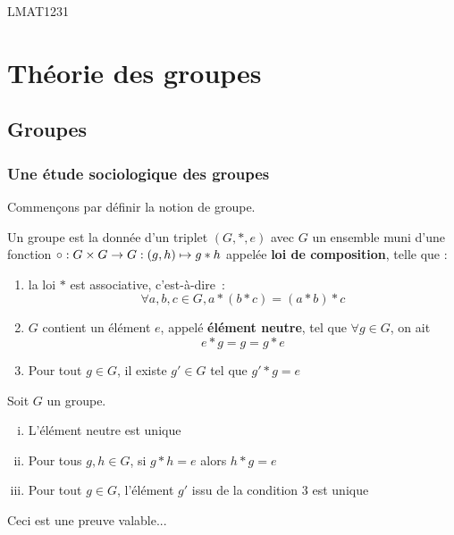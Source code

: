 \documentclass[french]{book}
\begin{document}
\begin{titlepage}
  \maketitle
  \thispagestyle{empty}
  \centering
  LMAT1231	
\end{titlepage}
\restoregeometry

\tableofcontents
\thispagestyle{empty}

\newpage


\part{Théorie des groupes}
\chapter{Groupes} 

\section{Une étude sociologique des groupes}
Commençons par définir la notion de groupe.
\begin{definition}
  Un groupe est la donnée d'un triplet $(G, *, e)$ avec $G$ un ensemble muni d'une fonction $\circ: G \times G \rightarrow G: (g, h) \mapsto g * h$ appelée \textbf{loi de composition}, telle que :
  \begin{enumerate}
    \item la loi $*$ est associative, c'est-à-dire : $$\forall a, b, c \in G, a * (b * c) = (a * b) * c$$
    \item $G$ contient un élément $e$, appelé \textbf{élément neutre}, tel que $\forall g \in G$, on ait
      $$e * g = g = g * e$$ 
    \item Pour tout $g \in G$, il existe $g' \in G$ tel que  $g' * g = e$
  \end{enumerate}
\end{definition}

\begin{proposition}
  Soit $G$ un groupe.
  \begin{enumerate}[(i)]
    \item L'élément neutre est unique
    \item Pour tous $g, h \in G$, si $g * h = e$ alors $h * g = e$
    \item Pour tout $g \in G$, l'élément $g'$ issu de la condition 3 est unique
  \end{enumerate}

  \tcblower
  \begin{preuve}
    Ceci est une preuve valable...
  \end{preuve}
\end{proposition}
\end{document}
